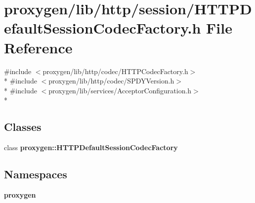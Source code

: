 \section{proxygen/lib/http/session/\+H\+T\+T\+P\+Default\+Session\+Codec\+Factory.h File Reference}
\label{HTTPDefaultSessionCodecFactory_8h}
{\ttfamily \#include $<$proxygen/lib/http/codec/\+H\+T\+T\+P\+Codec\+Factory.\+h$>$}\\*
{\ttfamily \#include $<$proxygen/lib/http/codec/\+S\+P\+D\+Y\+Version.\+h$>$}\\*
{\ttfamily \#include $<$proxygen/lib/services/\+Acceptor\+Configuration.\+h$>$}\\*
\subsection*{Classes}
\begin{DoxyCompactItemize}
\item 
class {\bf proxygen\+::\+H\+T\+T\+P\+Default\+Session\+Codec\+Factory}
\end{DoxyCompactItemize}
\subsection*{Namespaces}
\begin{DoxyCompactItemize}
\item 
 {\bf proxygen}
\end{DoxyCompactItemize}
